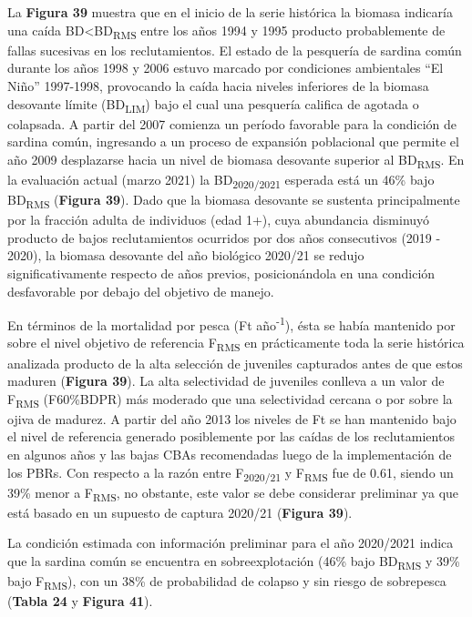 \documentclass[
  spanish,
]{article}
\begin{document}
La \textbf{Figura 39} muestra que en el inicio de la serie histórica la
biomasa indicaría una caída BD\textless BD\textsubscript{RMS} entre los
años 1994 y 1995 producto probablemente de fallas sucesivas en los
reclutamientos. El estado de la pesquería de sardina común durante los
años 1998 y 2006 estuvo marcado por condiciones ambientales ``El Niño''
1997-1998, provocando la caída hacia niveles inferiores de la biomasa
desovante límite (BD\textsubscript{LIM}) bajo el cual una pesquería
califica de agotada o colapsada. A partir del 2007 comienza un período
favorable para la condición de sardina común, ingresando a un proceso de
expansión poblacional que permite el año 2009 desplazarse hacia un nivel
de biomasa desovante superior al BD\textsubscript{RMS}. En la evaluación
actual (marzo 2021) la BD\textsubscript{2020/2021} esperada está un 46\%
bajo BD\textsubscript{RMS} (\textbf{Figura 39}). Dado que la biomasa
desovante se sustenta principalmente por la fracción adulta de
individuos (edad 1+), cuya abundancia disminuyó producto de bajos
reclutamientos ocurridos por dos años consecutivos (2019 - 2020), la
biomasa desovante del año biológico 2020/21 se redujo significativamente
respecto de años previos, posicionándola en una condición desfavorable
por debajo del objetivo de manejo.

En términos de la mortalidad por pesca (Ft año\textsuperscript{-1}),
ésta se había mantenido por sobre el nivel objetivo de referencia
F\textsubscript{RMS} en prácticamente toda la serie histórica analizada
producto de la alta selección de juveniles capturados antes de que estos
maduren (\textbf{Figura 39}). La alta selectividad de juveniles conlleva
a un valor de F\textsubscript{RMS} (F60\%BDPR) más moderado que una
selectividad cercana o por sobre la ojiva de madurez. A partir del año
2013 los niveles de Ft se han mantenido bajo el nivel de referencia
generado posiblemente por las caídas de los reclutamientos en algunos
años y las bajas CBAs recomendadas luego de la implementación de los
PBRs. Con respecto a la razón entre F\textsubscript{2020/21} y
F\textsubscript{RMS} fue de 0.61, siendo un 39\% menor a
F\textsubscript{RMS}, no obstante, este valor se debe considerar
preliminar ya que está basado en un supuesto de captura 2020/21
(\textbf{Figura 39}).

La condición estimada con información preliminar para el año 2020/2021
indica que la sardina común se encuentra en sobreexplotación (46\% bajo
BD\textsubscript{RMS} y 39\% bajo F\textsubscript{RMS}), con un 38\% de
probabilidad de colapso y sin riesgo de sobrepesca (\textbf{Tabla 24} y
\textbf{Figura 41}).
\end{document}
